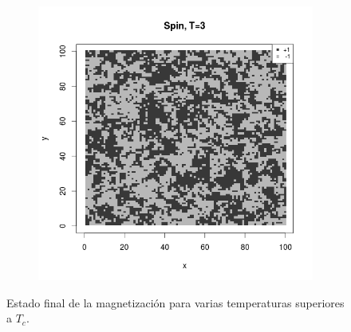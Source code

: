 \documentclass{scrartcl}
\begin{document}
\begin{figure}[ht]
\begin{subfigure}{.35\textwidth}
\end{subfigure}%
\begin{subfigure}{.35\textwidth}
  \centering
  \includegraphics[width=1\linewidth]{spins/spinT3}
\end{subfigure}
\caption{Estado final de la magnetización para varias temperaturas superiores a $T_c$.}
\label{fig:spinsmayorTc}
\end{figure}
\end{document}
